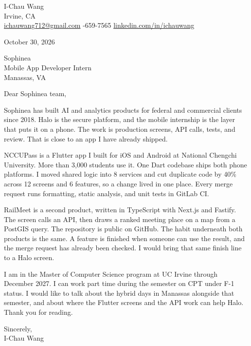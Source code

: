 \documentclass[11pt]{article}
\begin{document}
I-Chau Wang\\
Irvine, CA\\
\href{mailto:ichauwang712@gmail.com}{ichauwang712@gmail.com}
\quad\textbar{}-659-7565
\quad\textbar\quad
\href{https://linkedin.com/in/ichauwang}{linkedin.com/in/ichauwang}

\vspace{1.2em}

October 30, 2026

\vspace{1.2em}

Sophinea\\
Mobile App Developer Intern\\
Manassas, VA

\vspace{1.2em}

Dear Sophinea team,

Sophinea has built AI and analytics products for federal and commercial clients since 2018. Halo is the secure platform, and the mobile internship is the layer that puts it on a phone. The work is production screens, API calls, tests, and review. That is close to an app I have already shipped.

NCCUPass is a Flutter app I built for iOS and Android at National Chengchi University. More than 3,000 students use it. One Dart codebase ships both phone platforms. I moved shared logic into 8 services and cut duplicate code by 40\% across 12 screens and 6 features, so a change lived in one place. Every merge request runs formatting, static analysis, and unit tests in GitLab CI.

RailMeet is a second product, written in TypeScript with Next.js and Fastify. The screen calls an API, then draws a ranked meeting place on a map from a PostGIS query. The repository is public on GitHub. The habit underneath both products is the same. A feature is finished when someone can use the result, and the merge request has already been checked. I would bring that same finish line to a Halo screen.

I am in the Master of Computer Science program at UC Irvine through December 2027. I can work part time during the semester on CPT under F-1 status. I would like to talk about the hybrid days in Manassas alongside that semester, and about where the Flutter screens and the API work can help Halo. Thank you for reading.

\vspace{1.2em}

Sincerely,\\
I-Chau Wang
\end{document}
